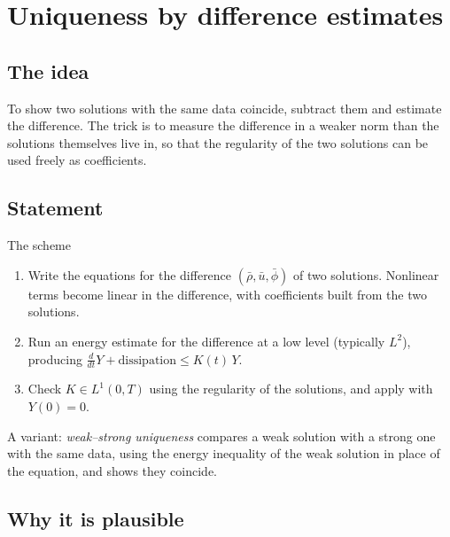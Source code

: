 
\section{Uniqueness by difference estimates}\label{p:uniqueness-energy}


\subsection*{The idea}

To show two solutions with the same data coincide, subtract them and estimate the difference. The trick is to measure the difference in a weaker norm than the solutions themselves live in, so that the regularity of the two solutions can be used freely as coefficients.

\subsection*{Statement}

\begin{thmbox}{The scheme}
%
\begin{enumerate}
\item Write the equations for the difference $(\bar\rho,\bar u,\bar\phi)$ of two solutions. Nonlinear terms become linear in the difference, with coefficients built from the two solutions.
\item Run an energy estimate for the difference at a low level (typically $L^2$), producing $\frac{d}{dt}Y + \text{dissipation}\le K(t)\,Y$.
\item Check $K\in L^1(0,T)$ using the regularity of the solutions, and apply  with $Y(0)=0$.
\end{enumerate}

A variant: \emph{weak--strong uniqueness} compares a weak solution with a strong one with the same data, using the energy inequality of the weak solution in place of the equation, and shows they coincide.
\end{thmbox}

\subsection*{Why it is plausible}


